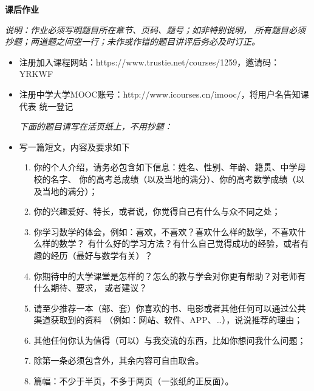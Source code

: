 \bigskip

\begin{ext}
	{\centering\bf 课后作业}
	
	{\b\it 说明：作业必须写明题目所在章节、页码、题号；如非特别说明，
	所有题目必须抄题；两道题之间空一行；未作或作错的题目讲评后务必及时订正。}
	
	\begin{itemize}
	  \item 注册加入课程网站：https://www.trustie.net/courses/1259，邀请码：YRKWF
	  \item 注册中学大学MOOC账号：http://www.icourses.cn/imooc/，将用户名告知课代表
	  统一登记
	  
	  {\b\it 下面的题目请写在活页纸上，不用抄题：}
	  \item 写一篇短文，内容及要求如下
	  \begin{enumerate}[(1)]
	    \item 你的个人介绍，请务必包含如下信息：姓名、性别、年龄、籍贯、中学母校的名字、
	    你的高考总成绩（以及当地的满分）、你的高考数学成绩（以及当地的满分）；
	    \item 你的兴趣爱好、特长，或者说，你觉得自己有什么与众不同之处；
	    \item 你学习数学的体会，例如：喜欢，不喜欢？喜欢什么样的数学，不喜欢什么样的数学？
	    有什么好的学习方法？有什么自己觉得成功的经验，或者有趣的经历（最好与数学有关）？
	    \item 你期待中的大学课堂是怎样的？怎么的教与学会对你更有帮助？对老师有什么期待、要求，
	    或者建议？
	    \item 请至少推荐一本（部、套）你喜欢的书、电影或者其他任何可以通过公共渠道获取到的资料
	    （例如：网站、软件、APP、\ldots），说说推荐的理由；
	    \item 其他任何你认为值得（可以）与我交流的东西，比如你想问我什么问题；
	    \item 除第一条必须包含外，其余内容可自由取舍。
	    \item 篇幅：不少于半页，不多于两页（一张纸的正反面）。
	  \end{enumerate}
	\end{itemize}
\end{ext}

